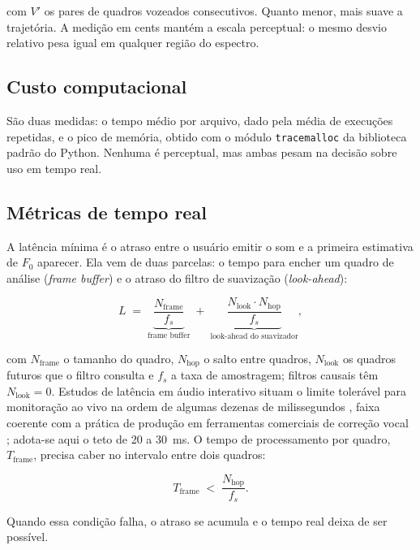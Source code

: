 \noindent com $V'$ os pares de quadros vozeados consecutivos. Quanto menor, mais suave a trajetória. A medição em cents mantém a escala perceptual: o mesmo desvio relativo pesa igual em qualquer região do espectro.

\subsection{Custo computacional}
São duas medidas: o tempo médio por arquivo, dado pela média de execuções repetidas, e o pico de memória, obtido com o módulo \texttt{tracemalloc} da biblioteca padrão do Python. Nenhuma é perceptual, mas ambas pesam na decisão sobre uso em tempo real.

\subsection{Métricas de tempo real}
A latência mínima é o atraso entre o usuário emitir o som e a primeira estimativa de $F_0$ aparecer. Ela vem de duas parcelas: o tempo para encher um quadro de análise (\textit{frame buffer}) e o atraso do filtro de suavização (\textit{look-ahead}):

\begin{equation}
\label{eq:latencia}
L \;=\; \underbrace{\frac{N_{\text{frame}}}{f_s}}_{\text{frame buffer}}
\;+\;
\underbrace{\frac{N_{\text{look}} \cdot N_{\text{hop}}}{f_s}}_{\text{look-ahead do suavizador}},
\end{equation}

\noindent com $N_{\text{frame}}$ o tamanho do quadro, $N_{\text{hop}}$ o salto entre quadros, $N_{\text{look}}$ os quadros futuros que o filtro consulta e $f_s$ a taxa de amostragem; filtros causais têm $N_{\text{look}} = 0$. Estudos de latência em áudio interativo situam o limite tolerável para monitoração ao vivo na ordem de algumas dezenas de milissegundos \cite{lagokon2004}, faixa coerente com a prática de produção em ferramentas comerciais de correção vocal \cite{antares_autotune_pro,ableton_manual}; adota-se aqui o teto de 20 a 30~ms. O tempo de processamento por quadro, $T_{\text{frame}}$, precisa caber no intervalo entre dois quadros:

\begin{equation}
\label{eq:tempo_real_viavel}
T_{\text{frame}} \;<\; \frac{N_{\text{hop}}}{f_s}.
\end{equation}

\noindent Quando essa condição falha, o atraso se acumula e o tempo real deixa de ser possível.

